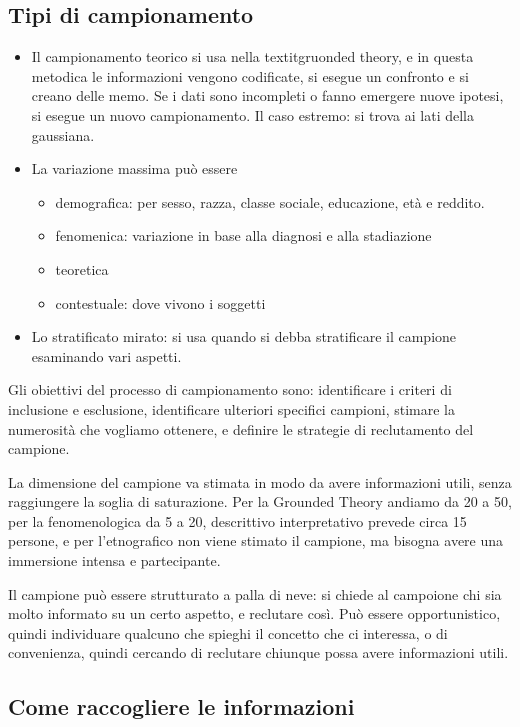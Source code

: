 \subsection{Tipi di campionamento}
\begin{itemize}
\item Il campionamento teorico si usa nella textit{gruonded theory}, e in questa metodica le informazioni vengono codificate, si esegue un confronto e si creano delle memo. Se i dati sono incompleti o fanno emergere nuove ipotesi, si esegue un nuovo campionamento.
Il caso estremo: si trova ai lati della gaussiana.
\item La variazione massima può essere
\begin{itemize}
\item demografica: per sesso, razza, classe sociale, educazione, età e reddito.
\item fenomenica: variazione in base alla diagnosi e alla stadiazione
\item teoretica
\item contestuale: dove vivono i soggetti
\end{itemize}
\item Lo stratificato mirato: si usa quando si debba stratificare il campione esaminando vari aspetti. 
\end{itemize}
Gli obiettivi del processo di campionamento sono: identificare i criteri di inclusione e esclusione, identificare ulteriori specifici campioni, stimare la numerosità che vogliamo ottenere, e definire le strategie di reclutamento del campione.

La dimensione del campione va stimata in modo da avere informazioni utili, senza raggiungere la soglia di saturazione.
Per la Grounded Theory andiamo da 20 a 50, per la fenomenologica da 5 a 20, descrittivo interpretativo prevede circa 15 persone, e per l'etnografico non viene stimato il campione, ma bisogna avere una immersione intensa e partecipante.

Il campione può essere strutturato a palla di neve: si chiede al campoione chi sia molto informato su un certo aspetto, e reclutare così.
Può essere opportunistico, quindi individuare qualcuno che spieghi il concetto che ci interessa, o di convenienza, quindi cercando di reclutare chiunque possa avere informazioni utili.

\subsection{Come raccogliere le informazioni}
